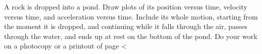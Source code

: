 A rock is dropped into a pond. Draw plots of its position
versus time, velocity versus time, and acceleration versus
time. Include its whole motion, starting from the moment it
is dropped, and continuing while it falls through the air,
passes through the water, and ends up at rest on the bottom of the pond.
Do your work on a photocopy or a printout of 
page <%
